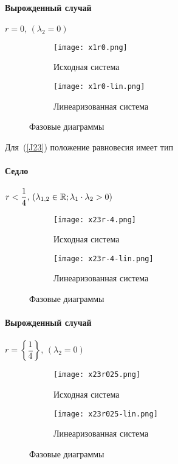     \paragraph*{Вырожденный случай} $r = 0 ,\,(\lambda_2 = 0 )$\nolinebreak
    \begin{figure}[H]
        \begin{subfigure}{0.5\linewidth}
            \texttt{[image: x1r0.png]}
            \caption{Исходная система}
        \end{subfigure}
        \begin{subfigure}{0.5\linewidth}
            \texttt{[image: x1r0-lin.png]}
            \caption{Линеаризованная система}
        \end{subfigure}
        \caption{Фазовые диаграммы}
    \end{figure}

    Для~(\ref{J23}) положение равновесия имеет тип
    \paragraph*{Седло} $r < \dfrac{1}{4},\,(\lambda_{1, 2} \in \operatorname{\mathbb{R}}; \lambda_1\cdot\lambda_2 > 0)$\nopagebreak
    \begin{figure}[H]
        \begin{subfigure}{0.5\linewidth}
            \texttt{[image: x23r-4.png]}
            \caption{Исходная система}
        \end{subfigure}
        \begin{subfigure}{0.5\linewidth}
            \texttt{[image: x23r-4-lin.png]}
            \caption{Линеаризованная система}
        \end{subfigure}
        \caption{Фазовые диаграммы}
    \end{figure}

    \paragraph*{Вырожденный случай}  $r = \left\{\dfrac{1}{4} \right\},\,(\lambda_2 = 0 )$\nopagebreak
    \begin{figure}[H]
        \begin{subfigure}{0.5\linewidth}
            \texttt{[image: x23r025.png]}
            \caption{Исходная система}
        \end{subfigure}
        \begin{subfigure}{0.5\linewidth}
            \texttt{[image: x23r025-lin.png]}
            \caption{Линеаризованная система}
        \end{subfigure}
        \caption{Фазовые диаграммы}
    \end{figure}

